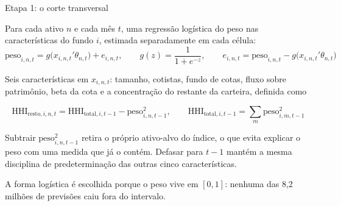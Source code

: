 \documentclass[aspectratio=169,11pt]{beamer}
\begin{document}
\begin{frame}{Etapa 1: o corte transversal}

Para cada ativo $n$ e cada mês $t$, uma regressão logística do peso nas características do
fundo $i$, estimada separadamente em cada célula:
\begin{equation*}
\text{peso}_{i,n,t} = g\big(x_{i,n,t}'\theta_{n,t}\big) + e_{i,n,t},
\qquad g(z)=\frac{1}{1+e^{-z}},
\qquad e_{i,n,t} = \text{peso}_{i,n,t} - g\big(x_{i,n,t}'\theta_{n,t}\big)
\end{equation*}

Seis características em $x_{i,n,t}$: tamanho, cotistas, fundo de cotas, fluxo sobre
patrimônio, beta da cota e a concentração do restante da carteira, definida como

\begin{equation*}
\text{HHI}_{\text{resto},i,n,t} = \text{HHI}_{\text{total},i,t-1} - \text{peso}_{i,n,t-1}^2,
\qquad
\text{HHI}_{\text{total},i,t-1} = \sum_{m} \text{peso}_{i,m,t-1}^2
\end{equation*}

\small
Subtrair $\text{peso}_{i,n,t-1}^2$ retira o próprio ativo-alvo do índice, o que evita
explicar o peso com uma medida que já o contém. Defasar para $t-1$ mantém a mesma
disciplina de predeterminação das outras cinco características.

\vspace{0.3em}
A forma logística é escolhida porque o peso vive em $[0,1]$: nenhuma das 8,2 milhões de
previsões caiu fora do intervalo.

\end{frame}
\end{document}
